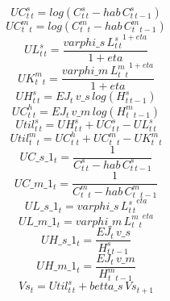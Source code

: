 \begin{dmath}
{ UC^s_t  _{t}}=log\left({ C^s_t _{t}}-{hab}\, { C^s_t _{t-1}}\right)
\end{dmath}
\begin{dmath}
{ UC^m_t  _{t}}=log\left({ C^m_t _{t}}-{hab}\, { C^m_t _{t-1}}\right)
\end{dmath}
\begin{dmath}
{  UL^s_t _{t}}=\frac{{varphi\_s}\, { L^s_t _{t}}^{1+{eta}}}{1+{eta}}
\end{dmath}
\begin{dmath}
{  UK^m_t _{t}}=\frac{{varphi\_m}\, { L^m_t _{t}}^{1+{eta}}}{1+{eta}}
\end{dmath}
\begin{dmath}
{  UH^s_t _{t}}={EJ_{t}}\, {v\_s}\, log\left({ H^s_t _{t-1}}\right)
\end{dmath}
\begin{dmath}
{ UC^h_t  _{t}}={EJ_{t}}\, {v\_m}\, log\left({ H^m_t _{t-1}}\right)
\end{dmath}
\begin{dmath}
{  Util^s_t _{t}}={  UH^s_t _{t}}+{ UC^s_t  _{t}}-{  UL^s_t _{t}}
\end{dmath}
\begin{dmath}
{ Util^m_t  _{t}}={ UC^h_t  _{t}}+{ UC^m_t  _{t}}-{  UK^m_t _{t}}
\end{dmath}
\begin{dmath}
{UC\_s\_1_{t}}=\frac{1}{{ C^s_t _{t}}-{hab}\, { C^s_t _{t-1}}}
\end{dmath}
\begin{dmath}
{UC\_m\_1_{t}}=\frac{1}{{ C^m_t _{t}}-{hab}\, { C^m_t _{t-1}}}
\end{dmath}
\begin{dmath}
{UL\_s\_1_{t}}={varphi\_s}\, { L^s_t _{t}}^{{eta}}
\end{dmath}
\begin{dmath}
{UL\_m\_1_{t}}={varphi\_m}\, { L^m_t _{t}}^{{eta}}
\end{dmath}
\begin{dmath}
{UH\_s\_1_{t}}=\frac{{EJ_{t}}\, {v\_s}}{{ H^s_t _{t-1}}}
\end{dmath}
\begin{dmath}
{UH\_m\_1_{t}}=\frac{{EJ_{t}}\, {v\_m}}{{ H^m_t _{t-1}}}
\end{dmath}
\begin{dmath}
{Vs_{t}}={  Util^s_t _{t}}+{betta\_s}\, {Vs_{t+1}}
\end{dmath}
